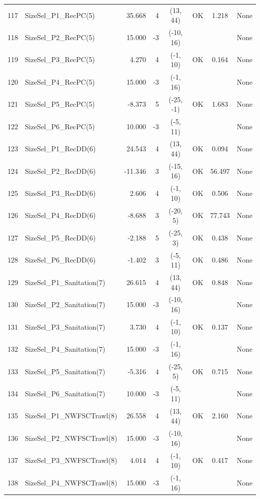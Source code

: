\documentclass[12pt,]{article}
\begin{document}
\begin{landscape}
\begin{longtable}{rlrrcccl}
  117 & SizeSel\_P1\_RecPC(5) & 35.668 & 4 & (13, 44) & OK & 1.218 & None \\ 
  118 & SizeSel\_P2\_RecPC(5) & 15.000 & -3 & (-10, 16) &  &  & None \\ 
  119 & SizeSel\_P3\_RecPC(5) & 4.270 & 4 & (-1, 10) & OK & 0.164 & None \\ 
  120 & SizeSel\_P4\_RecPC(5) & 15.000 & -3 & (-1, 16) &  &  & None \\ 
  121 & SizeSel\_P5\_RecPC(5) & -8.373 & 5 & (-25, -1) & OK & 1.683 & None \\ 
  122 & SizeSel\_P6\_RecPC(5) & 10.000 & -3 & (-5, 11) &  &  & None \\ 
  123 & SizeSel\_P1\_RecDD(6) & 24.543 & 4 & (13, 44) & OK & 0.094 & None \\ 
  124 & SizeSel\_P2\_RecDD(6) & -11.346 & 3 & (-15, 16) & OK & 56.497 & None \\ 
  125 & SizeSel\_P3\_RecDD(6) & 2.606 & 4 & (-1, 10) & OK & 0.506 & None \\ 
  126 & SizeSel\_P4\_RecDD(6) & -8.688 & 3 & (-20, 5) & OK & 77.743 & None \\ 
  127 & SizeSel\_P5\_RecDD(6) & -2.188 & 5 & (-25, 3) & OK & 0.438 & None \\ 
  128 & SizeSel\_P6\_RecDD(6) & -1.402 & 3 & (-5, 11) & OK & 0.486 & None \\ 
  129 & SizeSel\_P1\_Sanitation(7) & 26.615 & 4 & (13, 44) & OK & 0.848 & None \\ 
  130 & SizeSel\_P2\_Sanitation(7) & 15.000 & -3 & (-10, 16) &  &  & None \\ 
  131 & SizeSel\_P3\_Sanitation(7) & 3.730 & 4 & (-1, 10) & OK & 0.137 & None \\ 
  132 & SizeSel\_P4\_Sanitation(7) & 15.000 & -3 & (-1, 16) &  &  & None \\ 
  133 & SizeSel\_P5\_Sanitation(7) & -5.316 & 4 & (-25, 5) & OK & 0.715 & None \\ 
  134 & SizeSel\_P6\_Sanitation(7) & 10.000 & -3 & (-5, 11) &  &  & None \\ 
  135 & SizeSel\_P1\_NWFSCTrawl(8) & 26.558 & 4 & (13, 44) & OK & 2.160 & None \\ 
  136 & SizeSel\_P2\_NWFSCTrawl(8) & 15.000 & -3 & (-10, 16) &  &  & None \\ 
  137 & SizeSel\_P3\_NWFSCTrawl(8) & 4.014 & 4 & (-1, 10) & OK & 0.417 & None \\ 
  138 & SizeSel\_P4\_NWFSCTrawl(8) & 15.000 & -3 & (-1, 16) &  &  & None \\ 

\end{longtable}
\end{landscape}
\end{document}
